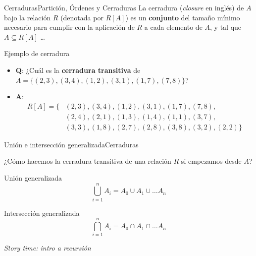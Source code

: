 \documentclass[spanish, c]{beamer}
\begin{document}
\begin{frame}{Cerraduras}{Partición, Órdenes y Cerraduras}
    La \alert{cerradura} (\textit{closure} en inglés) de $A$ bajo la relación $R$ (denotada por $R[A]$) es un \textbf{conjunto} del tamaño mínimo necesario para cumplir con la aplicación de $R$ a cada elemento de $A$, y tal que $A \subseteq R[A]$ \dots

    \pause

    \bigskip

    \begin{exampleblock}{Ejemplo de cerradura}
        \begin{itemize}
            \item \textbf{Q}: ¿Cuál es la \textbf{cerradura transitiva} de $A = \{(2, 3), (3, 4), (1, 2), (3, 1), (1,7),(7,8)\}$?
            \item \textbf{A}: \begin{align*}
                R[A] = \{& (2, 3), (3, 4), (1, 2), (3, 1), (1, 7), (7, 8), \\
                         & (2, 4), (2, 1), (1, 3), (1, 4), (1, 1), (3, 7), \\
                         & (3, 3), (1, 8), (2, 7), (2, 8), (3, 8), (3, 2), (2, 2) \}
            \end{align*}
        \end{itemize}        
    \end{exampleblock}

\end{frame}

\begin{frame}{Unión e intersección generalizada}{Cerraduras}

    ¿Cómo hacemos la cerradura transitiva de una relación $R$ si empezamos desde $A$? \pause

    \begin{block}{Unión generalizada}
        $$\bigcup_{i=1}^n A_i = A_0 \cup A_1 \cup \dots A_n$$
    \end{block} \pause

    \bigskip

    \begin{block}{Intersección generalizada}
        $$\bigcap_{i=1}^n A_i = A_0 \cap A_1 \cap \dots A_n$$
    \end{block}

    \bigskip

    \begin{center}
        \textit{Story time: intro a recursión}
    \end{center}

\end{frame}
\end{document}
